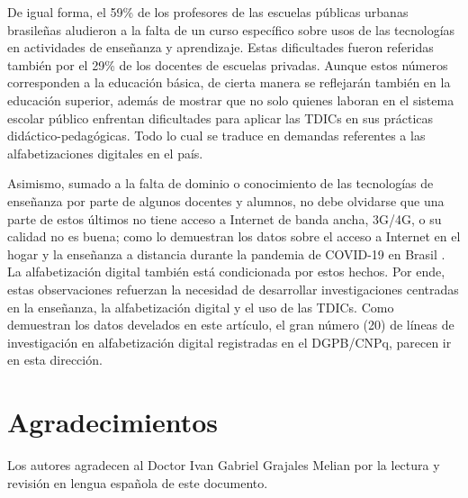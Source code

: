 \documentclass[spanish]{textolivre}
\begin{document}
De igual forma, el 59\% de los profesores de las escuelas públicas urbanas brasileñas aludieron a la falta de un curso específico sobre usos de las tecnologías en actividades de enseñanza y aprendizaje. Estas dificultades fueron referidas también por el 29\% de los docentes de escuelas privadas. Aunque estos números corresponden a la educación básica, de cierta manera se reflejarán también en la educación superior, además de mostrar que no solo quienes laboran en el sistema escolar público enfrentan dificultades para aplicar las TDICs en sus prácticas didáctico-pedagógicas. Todo lo cual se traduce en demandas referentes a las alfabetizaciones digitales en el país.  

Asimismo, sumado a la falta de dominio o conocimiento de las tecnologías de enseñanza por parte de algunos docentes y alumnos, no debe olvidarse que una parte de estos últimos no tiene acceso a Internet de banda ancha, 3G/4G, o su calidad no es buena; como lo demuestran los datos sobre el acceso a Internet en el hogar y la enseñanza a distancia durante la pandemia de COVID-19 en Brasil \cite{nascimento_acesso_2020}. La alfabetización digital también está condicionada por estos hechos. Por ende, estas observaciones refuerzan la necesidad de desarrollar investigaciones centradas en la enseñanza, la alfabetización digital y el uso de las TDICs. Como demuestran los datos develados en este artículo, el gran número (20) de líneas de investigación en alfabetización digital registradas en el DGPB/CNPq, parecen ir en esta dirección.

\section{Agradecimientos}\label{sec-agradecimentos}
Los autores agradecen al Doctor Ivan Gabriel Grajales Melian por la lectura y revisión en lengua española de este documento.

\printbibliography\label{sec-bib}
\end{document}
